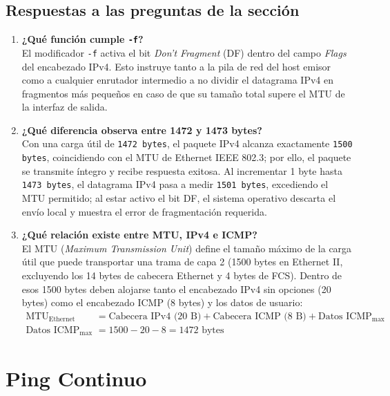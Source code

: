 \documentclass[11pt, a4paper]{article}
\begin{document}
\subsection*{Respuestas a las preguntas de la sección}
\begin{enumerate}
    \item \textbf{¿Qué función cumple \texttt{-f}?} \\
    El modificador \texttt{-f} activa el bit \textit{Don't Fragment} (DF) dentro del campo \textit{Flags} del encabezado IPv4. Esto instruye tanto a la pila de red del host emisor como a cualquier enrutador intermedio a no dividir el datagrama IPv4 en fragmentos más pequeños en caso de que su tamaño total supere el MTU de la interfaz de salida.
    \item \textbf{¿Qué diferencia observa entre 1472 y 1473 bytes?} \\
    Con una carga útil de \texttt{1472 bytes}, el paquete IPv4 alcanza exactamente \texttt{1500 bytes}, coincidiendo con el MTU de Ethernet IEEE 802.3; por ello, el paquete se transmite íntegro y recibe respuesta exitosa. Al incrementar 1 byte hasta \texttt{1473 bytes}, el datagrama IPv4 pasa a medir \texttt{1501 bytes}, excediendo el MTU permitido; al estar activo el bit DF, el sistema operativo descarta el envío local y muestra el error de fragmentación requerida.
    \item \textbf{¿Qué relación existe entre MTU, IPv4 e ICMP?} \\
    El MTU (\textit{Maximum Transmission Unit}) define el tamaño máximo de la carga útil que puede transportar una trama de capa 2 (1500 bytes en Ethernet II, excluyendo los 14 bytes de cabecera Ethernet y 4 bytes de FCS). Dentro de esos 1500 bytes deben alojarse tanto el encabezado IPv4 sin opciones (20 bytes) como el encabezado ICMP (8 bytes) y los datos de usuario:
    \begin{align*}
        \text{MTU}_{\text{Ethernet}} &= \text{Cabecera IPv4 (20 B)} + \text{Cabecera ICMP (8 B)} + \text{Datos ICMP}_{\max} \\
        \text{Datos ICMP}_{\max} &= 1500 - 20 - 8 = 1472\text{ bytes}
    \end{align*}
\end{enumerate}

\section{Ping Continuo}
\end{document}
